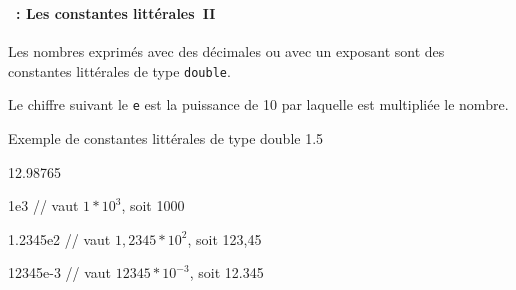 \begin{frame}[containsverbatim]
  \frametitle{\secname}
  \framesubtitle{\subsecname~: Les constantes littérales~II}
  
  Les nombres exprimés avec des décimales ou avec un exposant sont des constantes littérales de type \texttt{double}.
  \par
  \vspace{0.5cm}
  Le chiffre suivant le \texttt{e} est la puissance de 10 par laquelle est multipliée le nombre.

  \begin{exampleblock}{Exemple de constantes littérales de type double}
    1.5
    \par
    12.98765
    \par
    1e3 // vaut $1 * 10^{3}$, soit 1000
    \par
    1.2345e2 // vaut $1,2345 * 10^{2}$, soit 123,45
    \par
    12345e-3 // vaut $12345 * 10^{-3}$, soit 12.345
  \end{exampleblock}

\end{frame}


